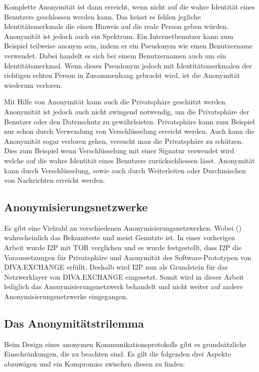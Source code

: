 Komplette Anonymität ist dann erreicht, wenn nicht auf die wahre Identität eines Benutzers geschlossen werden kann.
Das heisst es fehlen jegliche Identitätsmerkmale die einen Hinweis auf die reale Person geben würden.
Anonymität ist jedoch auch ein Spektrum.
Ein Internetbenutzer kann zum Beispiel teilweise anonym sein, indem er ein Pseudonym wie einen Benutzername verwendet.
Dabei handelt es sich bei einem Benutzernamen auch um ein Identitätsmerkmal.
Wenn dieses Pseudonym jedoch mit Identitätsmerkmalen der richtigen echten Person in Zusammenhang gebracht wird,
ist die Anonymität wiederum verloren. \parencite[S. 8-9]{maric_untersuchung_2020}

Mit Hilfe von Anonymität kann auch die Privatsphäre geschützt werden.
Anonymität ist jedoch auch nicht zwingend notwendig, um die Privatsphäre der Benutzer oder den Datenschutz zu gewährleisten.
Privatsphäre kann zum Beispiel nur schon durch Verwendung von Verschlüsselung erreicht werden.
Auch kann die Anonymität sogar verloren gehen, versucht man die Privatsphäre zu schützen.
Dies zum Beispiel wenn Verschlüsselung mit einer Signatur verwendet wird welche auf die wahre Identität eines Benutzers zurückschliessen lässt.
Anonymität kann durch Verschlüsselung, sowie auch durch Weiterleiten oder Durchmischen von Nachrichten erreicht werden.

\subsection{Anonymisierungsnetzwerke}

Es gibt eine Vielzahl an verschiedenen Anonymisierungsnetzwerken.
Wobei  () wahrscheinlich das Bekannteste und meist Genutzte ist.
In einer vorherigen Arbeit wurde I2P mit TOR verglichen und es wurde festgestellt, dass I2P die Voraussetzungen für Privatsphäre und Anonymität des Software-Prototypen von DIVA.EXCHANGE \parencite[S.~28-30]{maric_untersuchung_2020} erfüllt.
Deshalb wird I2P nun als Grundstein für das Netzwerklayer von DIVA.EXCHANGE eingesetzt.
Somit wird in dieser Arbeit lediglich das Anonymisierungsnetzwerk  behandelt und nicht weiter auf andere Anonymisierungsnetzwerke eingegangen.

\subsection{Das Anonymitätstrilemma}\label{sec:anonymitytrilemma}

Beim Design eines anonymen Kommunikationsprotokolls gibt es grundsätzliche Einschränkungen, die zu beachten sind.
Es gilt die folgenden drei Aspekte abzuwägen und ein Kompromiss zwischen diesen zu finden:

